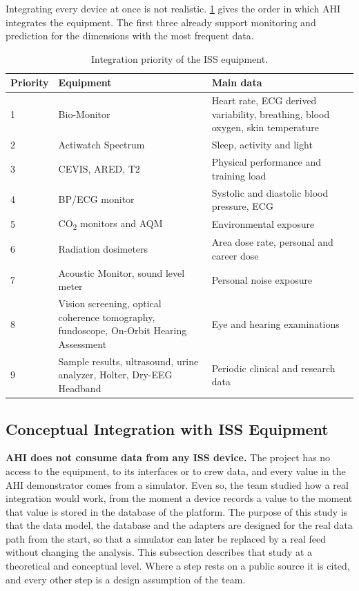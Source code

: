 Integrating every device at once is not realistic. \ref{tab:device-priority} gives the order in which AHI integrates the equipment. The first three already support monitoring and prediction for the dimensions with the most frequent data.

\begin{table}[htbp]
\centering
\vspace{0.8em}
\caption{Integration priority of the ISS equipment.}
\label{tab:device-priority}
\small
\begin{tabular}{p{1.4cm}p{4.0cm}p{8.6cm}}
\hline
\textbf{Priority} & \textbf{Equipment} & \textbf{Main data} \\
\hline
1 & Bio-Monitor & Heart rate, ECG derived variability, breathing, blood oxygen, skin temperature \\
2 & Actiwatch Spectrum & Sleep, activity and light \\
3 & CEVIS, ARED, T2 & Physical performance and training load \\
4 & BP/ECG monitor & Systolic and diastolic blood pressure, ECG \\
5 & CO\textsubscript{2} monitors and AQM & Environmental exposure \\
6 & Radiation dosimeters & Area dose rate, personal and career dose \\
7 & Acoustic Monitor, sound level meter & Personal noise exposure \\
8 & Vision screening, optical coherence tomography, fundoscope, On-Orbit Hearing Assessment & Eye and hearing examinations \\
9 & Sample results, ultrasound, urine analyzer, Holter, Dry-EEG Headband & Periodic clinical and research data \\
\hline
\end{tabular}
\vspace{1.2em}
\end{table}

\subsection{Conceptual Integration with ISS Equipment}
\label{subsec:integration-assumptions}

\textbf{AHI does not consume data from any ISS device.} The project has no access to the equipment, to its interfaces or to crew data, and every value in the AHI demonstrator comes from a simulator. Even so, the team studied how a real integration would work, from the moment a device records a value to the moment that value is stored in the database of the platform. The purpose of this study is that the data model, the database and the adapters are designed for the real data path from the start, so that a simulator can later be replaced by a real feed without changing the analysis. This subsection describes that study at a theoretical and conceptual level. Where a step rests on a public source it is cited, and every other step is a design assumption of the team.

